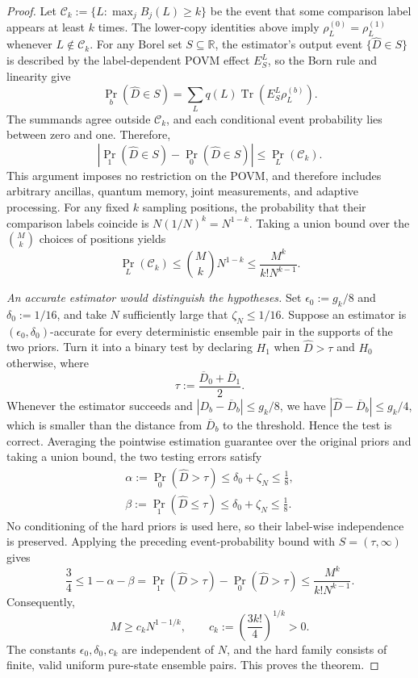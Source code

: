 \documentclass[aps,prx,reprint,superscriptaddress,amsmath,amssymb,longbibliography,floatfix]{revtex4-2}
\theoremstyle{plain}
\theoremstyle{definition}
\theoremstyle{remark}
\begin{document}
\begin{proof}
Let $\mathcal C_k:=\{L:\max_jB_j(L)\ge k\}$ be the event that some comparison label appears at least $k$ times. The lower-copy identities above imply $\rho_L^{(0)}=\rho_L^{(1)}$ whenever $L\notin\mathcal C_k$. For any Borel set $S\subseteq\mathbb R$, the estimator's output event $\{\widehat D\in S\}$ is described by the label-dependent POVM effect $E_S^L$, so the Born rule and linearity give
\[
\Pr_b(\widehat D\in S)=\sum_Lq(L)\operatorname{Tr}(E_S^L\rho_L^{(b)}).
\]
The summands agree outside $\mathcal C_k$, and each conditional event probability lies between zero and one. Therefore,
\begin{equation}
\left|\Pr_1(\widehat D\in S)-\Pr_0(\widehat D\in S)\right|\le\Pr_L(\mathcal C_k).
\label{eq:app-mmd-lower-event-distinguishability}
\end{equation}
This argument imposes no restriction on the POVM, and therefore includes arbitrary ancillas, quantum memory, joint measurements, and adaptive processing. For any fixed $k$ sampling positions, the probability that their comparison labels coincide is $N(1/N)^k=N^{1-k}$. Taking a union bound over the $\binom Mk$ choices of positions yields
\begin{equation}
\Pr_L(\mathcal C_k)\le\binom MkN^{1-k}\le\frac{M^k}{k!N^{k-1}}.
\label{eq:app-mmd-lower-collision-bound}
\end{equation}

\emph{An accurate estimator would distinguish the hypotheses.} Set $\epsilon_0:=g_k/8$ and $\delta_0:=1/16$, and take $N$ sufficiently large that $\zeta_N\le1/16$. Suppose an estimator is $(\epsilon_0,\delta_0)$-accurate for every deterministic ensemble pair in the supports of the two priors. Turn it into a binary test by declaring $H_1$ when $\widehat D>\tau$ and $H_0$ otherwise, where
\[
\tau:=\frac{\overline D_0+\overline D_1}{2}.
\]
Whenever the estimator succeeds and $|D_b-\overline D_b|\le g_k/8$, we have $|\widehat D-\overline D_b|\le g_k/4$, which is smaller than the distance from $\overline D_b$ to the threshold. Hence the test is correct. Averaging the pointwise estimation guarantee over the original priors and taking a union bound, the two testing errors satisfy
\[
\begin{gathered}
\alpha:=\Pr_0(\widehat D>\tau)\le\delta_0+\zeta_N\le\frac18,\\ \beta:=\Pr_1(\widehat D\le\tau)\le\delta_0+\zeta_N\le\frac18.
\end{gathered}
\]
No conditioning of the hard priors is used here, so their label-wise independence is preserved. Applying the preceding event-probability bound with $S=(\tau,\infty)$ gives
\[
\frac34\le1-\alpha-\beta=\Pr_1(\widehat D>\tau)-\Pr_0(\widehat D>\tau)\le\frac{M^k}{k!N^{k-1}}.
\]
Consequently,
\begin{equation}
M\ge c_kN^{1-1/k},\qquad c_k:=\left(\frac{3k!}{4}\right)^{1/k}>0.
\label{eq:app-mmd-general-sample-lower-bound}
\end{equation}
The constants $\epsilon_0,\delta_0,c_k$ are independent of $N$, and the hard family consists of finite, valid uniform pure-state ensemble pairs. This proves the theorem.
\end{proof}
\end{document}
